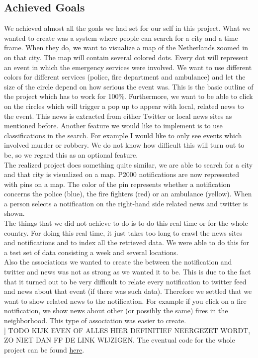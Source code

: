 \subsection*{Achieved Goals}
We achieved almost all the goals we had set for our self in this project. 
What we wanted to create was a system where people can search for a city and a time frame.
When they do, we want to visualize a map of the Netherlands zoomed in on that city. 
The map will contain several colored dots. 
Every dot will represent an event in which the emergency services were involved. 
We want to use different colors for different services (police, fire department and ambulance) and let the size of the circle depend on how serious the event was. This is the basic outline of the project which has to work for 100$\%$. Furthermore, we want to be able to click on the circles which will trigger a pop up to appear with local, related news to the event. This news is extracted from either Twitter or local news sites as mentioned before. Another feature we would like to implement is to use classifications in the search. For example I would like to only see events which involved murder or robbery. We do not know how difficult this will turn out to be, so we regard this as an optional feature.\\
The realized project does something quite similar, we are able to search for a city and that city is visualized on a map.
P2000 notifications are now represented with pins on a map. 
The color of the pin represents whether a notification concerns the police (blue), the fire fighters (red) or an ambulance (yellow).
When a person selects a notification on the right-hand side related news and twitter is shown.\\
The things that we did not achieve to do is to do this real-time or for the whole country. 
For doing this real time, it just takes too long to crawl the news sites and notifications and to index all the retrieved data.
We were able to do this for a test set of data consisting a week and several locations.\\
Also the associations we wanted to create the between the notification and twitter and news was not as strong as we wanted it to be.
This is due to the fact that it turned out to be very difficult to relate every notification to twitter feed and news about that event (if there was such data).
Therefore we settled that we want to show related news to the notification.
For example if you click on a fire notification, we show news about other (or possibly the same) fires in the neighborhood.
This type of association was easier to create.\\]
TODO KIJK EVEN OF ALLES HIER DEFINITIEF NEERGEZET WORDT, ZO NIET DAN FF DE LINK WIJZIGEN.
The eventual code for the whole project can be found \href{https://www.dropbox.com/home/Public/Code_2IMW15_Group_20}{here}.

